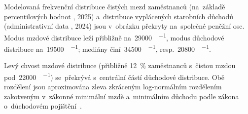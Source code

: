 Modelovaná frekvenční distribuce čistých mezd zaměstnanců  (na~základě percentilových hodnot , 2025) a~distribuce vyplácených starobních důchodů (administrativní data , 2024) jsou v~obrázku překryty na~společné peněžní ose. Modus mzdové distribuce leží přibližně na~\SI{29000}{\czk\per\month}, modus důchodové distribuce na~\SI{19500}{\czk\per\month}; mediány činí~\SI{34500}{\czk\per\month}, resp.~\SI{20800}{\czk\per\month}.

Levý chvost mzdové distribuce (přibližně 12~\% zaměstnanců s~čistou mzdou pod~\SI{22000}{\czk\per\month}) se~překrývá s~centrální částí důchodové distribuce. Obě rozdělení jsou aproximována zleva zkráceným log-normálním rozdělením zakotveným v~zákonné minimální mzdě a~minimálním důchodu podle zákona o~důchodovém pojištění~\cite{zakon_zpds_1995}.


